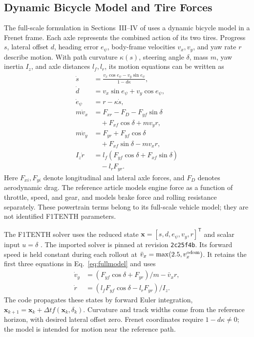 \subsection{Dynamic Bicycle Model and Tire Forces}
The full-scale formulation in Sections~III--IV of \cite{muraleedharan2025racing} uses a dynamic bicycle model in a Frenet frame. Each axle represents the combined action of its two tires. Progress $s$, lateral offset $d$, heading error $e_\psi$, body-frame velocities $v_x,v_y$, and yaw rate $r$ describe motion. With path curvature $\kappa(s)$, steering angle $\delta$, mass $m$, yaw inertia $I_z$, and axle distances $l_f,l_r$, its motion equations can be written as
\begin{equation}
\begin{aligned}
\dot s &= \frac{v_x\cos e_\psi-v_y\sin e_\psi}{1-d\kappa},\\
\dot d &= v_x\sin e_\psi+v_y\cos e_\psi,\\
\dot e_\psi &= r-\kappa\dot s,\\
m\dot v_x &= F_{xr}-F_D-F_{yf}\sin\delta\\
 &\quad +F_{xf}\cos\delta+mv_yr,\\
m\dot v_y &= F_{yr}+F_{yf}\cos\delta\\
 &\quad +F_{xf}\sin\delta-mv_xr,\\
I_z\dot r &= l_f(F_{yf}\cos\delta+F_{xf}\sin\delta)\\
 &\quad -l_rF_{yr}.
\end{aligned}\label{eq:fullmodel}
\end{equation}
Here $F_{xi},F_{yi}$ denote longitudinal and lateral axle forces, and $F_D$ denotes aerodynamic drag. The reference article models engine force as a function of throttle, speed, and gear, and models brake force and rolling resistance separately. These powertrain terms belong to its full-scale vehicle model; they are not identified F1TENTH parameters.

The F1TENTH solver uses the reduced state $\mathbf x=[s,d,e_\psi,v_y,r]^\mathsf T$ and scalar input $u=\delta$ \cite{mulakaloori2026repo,muraleedharan2026solver}. The imported solver is pinned at revision \texttt{2c25f4b}. Its forward speed is held constant during each rollout at $\bar v_x=\max(2.5,v_x^{\rm odom})$. It retains the first three equations in Eq.~\ref{eq:fullmodel} and uses
\begin{equation}
\begin{aligned}
\dot v_y &= (F_{yf}\cos\delta+F_{yr})/m-\bar v_xr,\\
\dot r &= (l_fF_{yf}\cos\delta-l_rF_{yr})/I_z.
\end{aligned}\label{eq:reducedmodel}
\end{equation}
The code propagates these states by forward Euler integration, $\mathbf x_{k+1}=\mathbf x_k+\Delta t f(\mathbf x_k,\delta_k)$. Curvature and track widths come from the reference horizon, with desired lateral offset zero. Frenet coordinates require $1-d\kappa\ne0$; the model is intended for motion near the reference path.

